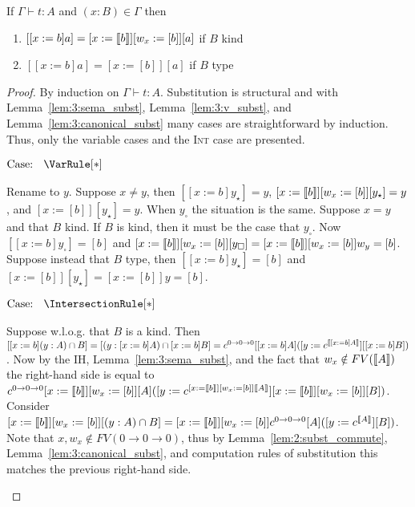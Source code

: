 \begin{lemma}
    \label{lem:3:subst}
    If $\Gamma \vdash t : A$ and $(x : B) \in \Gamma$ then
    \begin{enumerate}
        \item $[[x := b]a] = [x := \llbracket b \rrbracket][w_x := [b]][a]$ if $B$ kind
        \item $[[x := b]a] = [x := [b]][a]$ if $B$ type
    \end{enumerate}
\end{lemma}
\begin{proof}
    By induction on $\Gamma \vdash t : A$.
    Substitution is structural and with Lemma~\ref{lem:3:sema_subst}, Lemma~\ref{lem:3:v_subst}, and Lemma~\ref{lem:3:canonical_subst} many cases are straightforward by induction.
    Thus, only the variable cases and the \textsc{Int} case are presented.

    $\text{Case: }\begin{array}{c} \VarRule[*] \end{array}$
    \begin{proofcase}
        Rename to $y$.
        Suppose $x \neq y$, then $[[x := b]y_\star] = y$, $[x := \llbracket b \rrbracket][w_x := [b]][y_\star] = y$, and $[x := [b]][y_\star] = y$.
        When $y_\square$ the situation is the same.
        Suppose $x = y$ and that $B$ kind.
        If $B$ is kind, then it must be the case that $y_\square$.
        Now $[[x := b]y_\square] = [b]$ and  $[x := \llbracket b \rrbracket][w_x := [b]][y_\square] = [x := \llbracket b \rrbracket][w_x := [b]]w_y = [b]$.
        Suppose instead that $B$ type, then $[[x := b]y_\star] = [b]$ and $[x := [b]][y_\star] = [x := [b]]y = [b]$.
    \end{proofcase}

    $\text{Case: }\begin{array}{c} \IntersectionRule[*] \end{array}$
    \begin{proofcase}
        Suppose w.l.o.g. that $B$ is a kind.
        Then $[[x := b](y : A) \cap B] = [(y : [x := b]A) \cap [x := b]B] = c^{0 \to 0 \to 0}[[x := b]A] ([y := c^{\llbracket [x := b]A \rrbracket}][[x := b]B])$.
        Now by the IH, Lemma~\ref{lem:3:sema_subst}, and the fact that $w_x \notin FV(\llbracket A \rrbracket)$ the right-hand side is equal to $c^{0 \to 0 \to 0}[x := \llbracket b \rrbracket][w_x := [b]][A] ([y := c^{[x := \llbracket b \rrbracket][w_x := [b]]\llbracket A \rrbracket}][x := \llbracket b \rrbracket][w_x := [b]][B])$.
        Consider $[x := \llbracket b \rrbracket][w_x := [b]][(y : A) \cap B] = [x := \llbracket b \rrbracket][w_x := [b]]c^{0 \to 0 \to 0}[A] ([y := c^{\llbracket A \rrbracket}][B])$.
        Note that $x, w_x \notin FV(0 \to 0 \to 0)$, thus by Lemma~\ref{lem:2:subst_commute}, Lemma~\ref{lem:3:canonical_subst}, and computation rules of substitution this matches the previous right-hand side.
    \end{proofcase}
\end{proof}

